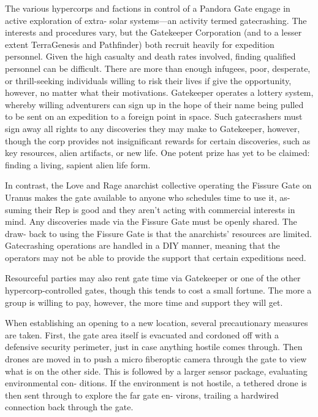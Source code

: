 The various hypercorps and factions in control of a 
Pandora Gate engage in active exploration of extra-
solar systems—an activity termed gatecrashing. The 
interests and procedures vary, but the Gatekeeper 
Corporation (and to a lesser extent TerraGenesis 
and Pathfinder) both recruit heavily for expedition 
personnel. Given the high casualty and death rates 
involved, finding qualified personnel can be difficult. 
There are more than enough infugees, poor, desperate, 
or thrill-seeking individuals willing to risk their lives 
if give the opportunity, however, no matter what their 
motivations. Gatekeeper operates a lottery system, 
whereby willing adventurers can sign up in the hope 
of their name being pulled to be sent on an expedition 
to a foreign point in space. Such gatecrashers must 
sign away all rights to any discoveries they may make 
to Gatekeeper, however, though the corp provides not 
insignificant rewards for certain discoveries, such as 
key resources, alien artifacts, or new life. One potent 
prize has yet to be claimed: finding a living, sapient 
alien life form.

In contrast, the Love and Rage anarchist collective 
operating the Fissure Gate on Uranus makes the gate 
available to anyone who schedules time to use it, as-
suming their Rep is good and they aren't acting with 
commercial interests in mind. Any discoveries made 
via the Fissure Gate must be openly shared. The draw-
back to using the Fissure Gate is that the anarchists' 
resources are limited. Gatecrashing operations are 
handled in a DIY manner, meaning that the operators 
may not be able to provide the support that certain 
expeditions need.

Resourceful parties may also rent gate time via 
Gatekeeper or one of the other hypercorp-controlled 
gates, though this tends to cost a small fortune. The 
more a group is willing to pay, however, the more time 
and support they will get.

When establishing an opening to a new location, 
several precautionary measures are taken. First, the 
gate area itself is evacuated and cordoned off with 
a defensive security perimeter, just in case anything 
hostile comes through. Then drones are moved in to 
push a micro fiberoptic camera through the gate to 
view what is on the other side. This is followed by a 
larger sensor package, evaluating environmental con-
ditions. If the environment is not hostile, a tethered 
drone is then sent through to explore the far gate en-
virons, trailing a hardwired connection back through 
the gate. 


